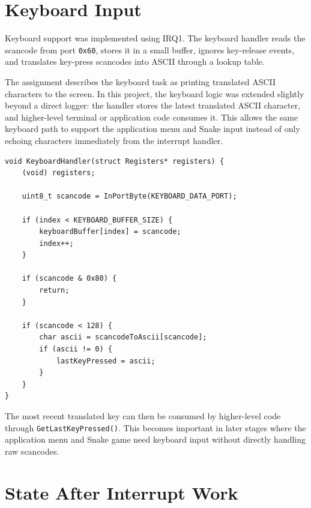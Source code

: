 \section{Keyboard Input}

Keyboard support was implemented using IRQ1. The keyboard handler reads the scancode from port \texttt{0x60}, stores it in a small buffer, ignores key-release events, and translates key-press scancodes into ASCII through a lookup table\cite{osdevPs2Controller}.

The assignment describes the keyboard task as printing translated ASCII characters to the screen. In this project, the keyboard logic was extended slightly beyond a direct logger: the handler stores the latest translated ASCII character, and higher-level terminal or application code consumes it. This allows the same keyboard path to support the application menu and Snake input instead of only echoing characters immediately from the interrupt handler.

\begin{listing}[H]
\begin{verbatim}
void KeyboardHandler(struct Registers* registers) {
    (void) registers;

    uint8_t scancode = InPortByte(KEYBOARD_DATA_PORT);

    if (index < KEYBOARD_BUFFER_SIZE) {
        keyboardBuffer[index] = scancode;
        index++;
    }

    if (scancode & 0x80) {
        return;
    }

    if (scancode < 128) {
        char ascii = scancodeToAscii[scancode];
        if (ascii != 0) {
            lastKeyPressed = ascii;
        }
    }
}
\end{verbatim}
\caption{Keyboard IRQ handler reading scancodes and storing the latest ASCII key.}
\end{listing}

The most recent translated key can then be consumed by higher-level code through \texttt{GetLastKeyPressed()}. This becomes important in later stages where the application menu and Snake game need keyboard input without directly handling raw scancodes.
\clearpage

\section{State After Interrupt Work}

